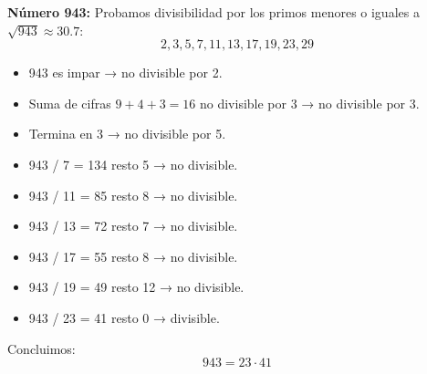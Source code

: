 \documentclass[a4paper,12pt]{article}
\begin{document}
\begin{ejercicio}[title=Ejercicio 17]
    
    \textbf{Número 943:}
        Probamos divisibilidad por los primos menores o iguales a $\sqrt{943} \approx 30.7$:
        \[
        2,3,5,7,11,13,17,19,23,29
        \]
        \begin{itemize}
            \item 943 es impar → no divisible por 2.
            \item Suma de cifras $9+4+3=16$ no divisible por 3 → no divisible por 3.
            \item Termina en 3 → no divisible por 5.
            \item 943 / 7 = 134 resto 5 → no divisible.
            \item 943 / 11 = 85 resto 8 → no divisible.
            \item 943 / 13 = 72 resto 7 → no divisible.
            \item 943 / 17 = 55 resto 8 → no divisible.
            \item 943 / 19 = 49 resto 12 → no divisible.
            \item 943 / 23 = 41 resto 0 → divisible.
        \end{itemize}
        Concluimos:
        \[
        \boxed{943 = 23 \cdot 41}
        \]

\end{ejercicio}
\end{document}
